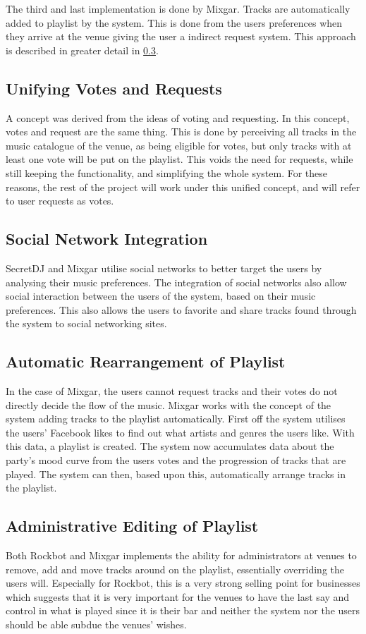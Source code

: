 The third and last implementation is done by Mixgar. Tracks are  automatically added to playlist by the system. This is done from the users preferences when they arrive at the venue giving the user a indirect request system. This approach is described in greater detail in \cref{sub:auto_rearrange_playlist}.

\subsection{Unifying Votes and Requests}
A concept was derived from the ideas of voting and requesting. In this concept, votes and request are the same thing. This is done by perceiving all tracks in the music catalogue of the venue, as being eligible for votes, but only tracks with at least one vote will be put on the playlist. This voids the need for requests, while still keeping the functionality, and simplifying the whole system.
For these reasons, the rest of the project will work under this unified concept, and will refer to user requests as votes. 

\subsection{Social Network Integration}
SecretDJ and Mixgar utilise social networks to better target the users by analysing their music preferences. The integration of social networks also allow social interaction between the users of the system, based on their music preferences. This also allows the users to favorite and share tracks found through the system to social networking sites.

\subsection{Automatic Rearrangement of Playlist}
\label{sub:auto_rearrange_playlist}
In the case of Mixgar, the users cannot request tracks and their votes do not directly decide the flow of the music. 
Mixgar works with the concept of the system adding tracks to the playlist automatically. First off the system utilises the users’ Facebook likes to find out what artists and genres the users like. With this data, a playlist is created. The system now accumulates data about the party’s mood curve from the users votes and the progression of tracks that are played. The system can then, based upon this, automatically arrange tracks in the playlist.

\subsection{Administrative Editing of Playlist}
Both Rockbot and Mixgar implements the ability for administrators at venues to remove, add and move tracks around on the playlist, essentially overriding the users will. Especially for Rockbot, this is a very strong selling point for businesses which suggests that it
is very important for the venues to have the last say and control in what is played since it is their bar and neither the system nor the users should be able subdue the venues' wishes.


